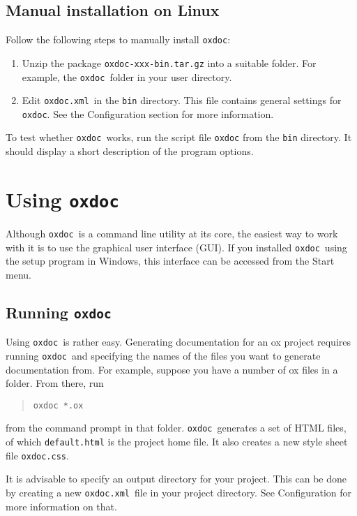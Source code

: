 \documentclass[11pt]{article}
\newcommand\oxdoc{{\tt oxdoc}}
\newcommand\oxdocxml{{\tt oxdoc.xml}}
\begin{document}
\subsection{Manual installation on Linux}
Follow the following steps to manually install \oxdoc:
\begin{enumerate}
\item Unzip the package {\tt oxdoc-xxx-bin.tar.gz} into a
suitable folder. For example, the \oxdoc~folder in your user directory.

\item Edit \oxdocxml~in the {\tt bin} directory. This file contains general settings for \oxdoc.
See the Configuration section for more information.
\end{enumerate}

To test whether \oxdoc~works, run the script file {\tt oxdoc} from the {\tt bin} directory.  It should 
display a short description of the program options.










\newpage\section{Using \oxdoc}
Although \oxdoc~is a command line utility at its core, the easiest way to work with it is to use
the graphical user interface (GUI).  If you installed \oxdoc~using the setup program in Windows, 
this interface can be accessed from the Start menu. 

\subsection{Running \oxdoc}
Using \oxdoc~is rather easy. Generating documentation for an ox project
requires running \oxdoc~and specifying the names of the files you
want to generate documentation from. For example, suppose you have a number
of ox files in a folder. From there, run 
\begin{quote}
\tt oxdoc *.ox
\end{quote}

from the command prompt in that folder. \oxdoc~generates a set
of HTML files, of which {\tt default.html} is the project home file. It also
creates a new style sheet file {\tt oxdoc.css}.

It is advisable to specify an output directory for your project. This can
be done by creating a new \oxdocxml~file in your project directory. See 
Configuration for more information on that.
\end{document}

